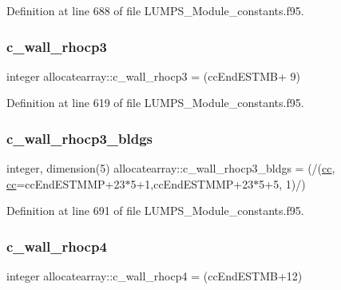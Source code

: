 Definition at line 688 of file L\+U\+M\+P\+S\+\_\+\+Module\+\_\+constants.\+f95.

\mbox{\label{namespaceallocatearray_ad97c8838bb89895527b446537b3ea2d1}} 
\subsubsection{\texorpdfstring{c\+\_\+wall\+\_\+rhocp3}{c\_wall\_rhocp3}}
{\footnotesize\ttfamily integer allocatearray\+::c\+\_\+wall\+\_\+rhocp3 = (cc\+End\+E\+S\+T\+MB+ 9)}



Definition at line 619 of file L\+U\+M\+P\+S\+\_\+\+Module\+\_\+constants.\+f95.

\mbox{\label{namespaceallocatearray_a60eaef231cee8d3b58a1c5284dd51d4c}} 
\subsubsection{\texorpdfstring{c\+\_\+wall\+\_\+rhocp3\+\_\+bldgs}{c\_wall\_rhocp3\_bldgs}}
{\footnotesize\ttfamily integer, dimension(5) allocatearray\+::c\+\_\+wall\+\_\+rhocp3\+\_\+bldgs = (/(\hyperlink{namespaceallocatearray_ac863c81704eb507dee10f5e10741e10c}{cc}, \hyperlink{namespaceallocatearray_ac863c81704eb507dee10f5e10741e10c}{cc}=cc\+End\+E\+S\+T\+M\+MP+23$\ast$5+1,cc\+End\+E\+S\+T\+M\+MP+23$\ast$5+5, 1)/)}



Definition at line 691 of file L\+U\+M\+P\+S\+\_\+\+Module\+\_\+constants.\+f95.

\mbox{\label{namespaceallocatearray_aa36297cd251e35b468d761ad93c91fa3}} 
\subsubsection{\texorpdfstring{c\+\_\+wall\+\_\+rhocp4}{c\_wall\_rhocp4}}
{\footnotesize\ttfamily integer allocatearray\+::c\+\_\+wall\+\_\+rhocp4 = (cc\+End\+E\+S\+T\+MB+12)}



